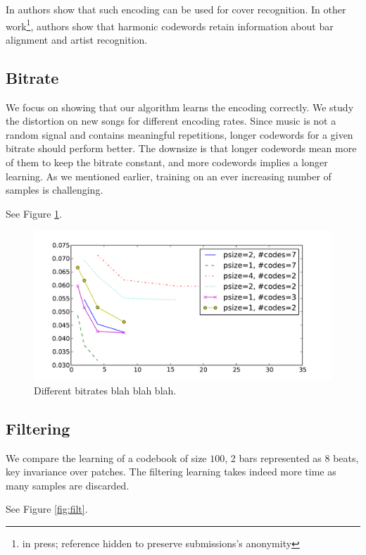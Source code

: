 \documentclass{sig-alternate}
\begin{document}
In \cite{Casey2006} authors show that such encoding can be used for
cover recognition. In other work\footnote{in press; reference hidden
to preserve submissions's anonymity}, authors show that harmonic codewords
retain information about bar alignment and artist recognition.

\subsection{Bitrate}

We focus on showing that our algorithm learns the encoding correctly.
We study the distortion on new songs for different encoding rates.
Since music is not a random signal and contains meaningful repetitions,
longer codewords for a given bitrate should perform better. The downsize
is that longer codewords mean more of them to keep the bitrate constant,
and more codewords implies a longer learning. As we mentioned earlier,
training on an ever increasing number of samples is challenging.

See Figure \ref{fig:bitrates}.

\begin{figure}[thb]
\begin{center}
\includegraphics[width=.9\columnwidth]{bitrates}
\end{center}
\caption{\small{Different bitrates blah blah blah.
}}
\label{fig:bitrates}
\end{figure}

\subsection{Filtering}
We compare the learning of a codebook of size $100$, 2 bars represented
as 8 beats, key invariance over patches. The filtering learning
takes indeed more time as many samples are discarded.

See Figure \ref{fig:filt}.
\end{document}
